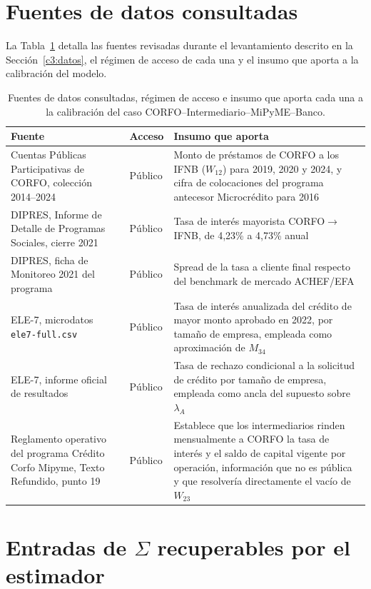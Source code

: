 \section{Fuentes de datos consultadas}
\label{anexo:fuentes}

La Tabla~\ref{tab:fuentes} detalla las fuentes revisadas durante el
levantamiento descrito en la Sección~\ref{c3:datos}, el régimen de acceso de
cada una y el insumo que aporta a la calibración del modelo.

\begin{table}[htbp]
\centering
\caption[Fuentes de datos consultadas para la calibración empírica]{Fuentes de datos consultadas, régimen de acceso e insumo que aporta cada una a la calibración del caso CORFO--Intermediario--MiPyME--Banco.}
\label{tab:fuentes}
\small
\begin{tabular}{p{}p{}p{}}
\hline
Fuente & Acceso & Insumo que aporta \\
\hline
Cuentas Públicas Participativas de CORFO, colección 2014--2024 & Público &
Monto de préstamos de CORFO a los IFNB ($W_{12}$) para 2019, 2020 y 2024, y
cifra de colocaciones del programa antecesor Microcrédito para 2016 \\
DIPRES, Informe de Detalle de Programas Sociales, cierre 2021 & Público &
Tasa de interés mayorista CORFO$\to$IFNB, de 4,23\% a 4,73\% anual \\
DIPRES, ficha de Monitoreo 2021 del programa & Público &
Spread de la tasa a cliente final respecto del benchmark de mercado ACHEF/EFA \\
ELE-7, microdatos \texttt{ele7-full.csv} & Público &
Tasa de interés anualizada del crédito de mayor monto aprobado en 2022, por
tamaño de empresa, empleada como aproximación de $M_{34}$ \\
ELE-7, informe oficial de resultados & Público &
Tasa de rechazo condicional a la solicitud de crédito por tamaño de empresa,
empleada como ancla del supuesto sobre $\lambda_A$ \\
Reglamento operativo del programa Crédito Corfo Mipyme, Texto Refundido, punto 19 & Público &
Establece que los intermediarios rinden mensualmente a CORFO la tasa de interés y
el saldo de capital vigente por operación, información que no es pública y que
resolvería directamente el vacío de $W_{23}$ \\
\hline
\end{tabular}
\end{table}

\section{Entradas de $\Sigma$ recuperables por el estimador}
\label{anexo:entradas}

